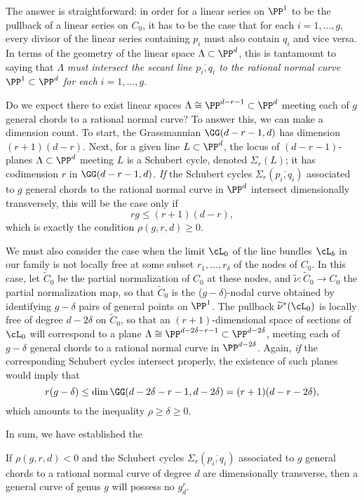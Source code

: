 The answer is straightforward: in order for a linear series on $\PP^1$ to be the pullback of a linear series on $C_0$, it has to be the case that for each $i = 1,\dots, g$, every divisor of the linear series containing $p_i$ must also contain $q_i$ and vice versa. In terms of the geometry of the linear space $\Lambda \subset \PP^d$, this is tantamount to saying that \emph{$\Lambda$ must intersect the secant line $\overline{p_i,q_i}$ to the rational normal curve $\PP^1 \subset \PP^d$ for each $i=1,\dots,g$}.

Do we expect there to exist linear spaces $\Lambda \cong \PP^{d-r-1} \subset \PP^d$ meeting each of $g$ general chords to a rational normal curve? To answer this, we can make a dimension count. To start, the Grassmannian $\GG(d-r-1,d)$ has dimension $(r+1)(d-r)$. Next, for a given line $L \subset \PP^d$, the locus of $(d-r-1)$-planes $\Lambda \subset \PP^d$ meeting $L$ is a Schubert cycle, denoted $\Sigma_r(L)$; it has codimension $r$ in $\GG(d-r-1,d)$. \emph{If}  the Schubert cycles $\Sigma_r(\overline{p_i,q_i})$ associated to $g$ general chords to the rational normal curve in $\PP^d$ intersect dimensionally transversely, this will be the case only if
$$
rg \leq (r+1)(d-r),
$$
which is exactly the condition $\rho(g,r,d) \geq 0$.

We must also consider the case when the limit $\cL_0$ of the line bundles $\cL_b$ in our family is not locally free at some subset $r_1, \dots, r_\delta$ of the nodes of $C_0$. In this case, let $\widetilde C_0$ be the partial normalization of $C_0$ at these nodes, and $\widetilde \nu : \widetilde C_0 \to C_0$ the partial normalization map, so that $\widetilde C_0$ is the ($g-\delta$)-nodal curve obtained by identifying $g-\delta$ pairs of general points on $\PP^1$. The pullback $\widetilde \nu^*(\cL_0)$ is  locally free of degree $d-2\delta$ on $\widetilde C_0$, so that an $(r+1)$-dimensional space of sections of $\cL_0$ will correspond to a plane $\Lambda \cong \PP^{d-2\delta-r-1} \subset \PP^{d-2\delta}$, meeting each of $g-\delta$ general chords to a rational normal curve in $\PP^{d-2\delta}$. Again, \emph{if} the corresponding Schubert cycles intersect properly, the existence of such planes would imply that
$$
r(g-\delta) \leq \dim\GG(d-2\delta-r-1,d-2\delta) = (r+1)(d-r-2\delta),
$$
which amounts to the inequality $\rho \geq \delta \geq 0$. 

In sum, we have established the 

\begin{theorem} If $\rho(g,r,d)<0$ and 
the Schubert cycles $\Sigma_r(\overline{p_i,q_i})$ associated to $g$ general chords to a rational normal curve of degree $d$ are dimensionally transverse, then a general curve of genus $g$ will possess no $g^r_d$.
\end{theorem}

